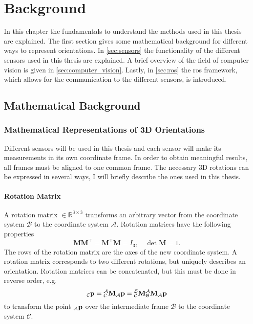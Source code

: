 \chapter{Background}
\label{ch:Background}
In this chapter the fundamentals to understand the methods used in this thesis are explained.
The first section gives some mathematical background for different ways to represent orientations.
In \cref{sec:sensors} the functionality of the different sensors used in this thesis are explained.
A brief overview of the field of computer vision is given in \cref{sec:computer_vision}.
Lastly, in \cref{sec:ros} the \gls{ros} framework, which allows for the communication to the different sensors, is introduced.


\section{Mathematical Background}
\subsection{Mathematical Representations of 3D Orientations}
Different sensors will be used in this thesis and each sensor will make its measurements in its own coordinate frame.
In order to obtain meaningful results, all frames must be aligned to one common frame.
The necessary 3D rotations can be expressed in several ways, I will briefly describe the ones used in this thesis.

\subsubsection{Rotation Matrix}
A rotation matrix  $\in \mathbb{R}^{3\times3}$ transforms an arbitrary vector from the coordinate system $\mathcal{B}$ to the coordinate system $\mathcal{A}$.
Rotation matrices have the following properties
\begin{equation}
    \mathbf{M}\mathbf{M}^\intercal = \mathbf{M}^\intercal \mathbf{M} = I_3, \quad \det \mathbf{M} = 1.
\end{equation}
The rows of the rotation matrix are the axes of the new coordinate system.
A rotation matrix corresponds to two different rotations, but uniquely describes an orientation.
Rotation matrices can be concatenated, but this must be done in reverse order, e.g.
\begin{equation}
    {}_\mathcal{C}\vb{p} = \mtf{a}{c}{}_\mathcal{A}\vb{p} = \mtf{b}{c}\mtf{a}{b}{}_\mathcal{A}\vb{p}
\end{equation}
to transform the point ${}_\mathcal{A}\vb{p}$ over the intermediate frame $\mathcal{B}$ to the coordinate system $\mathcal{C}$.

